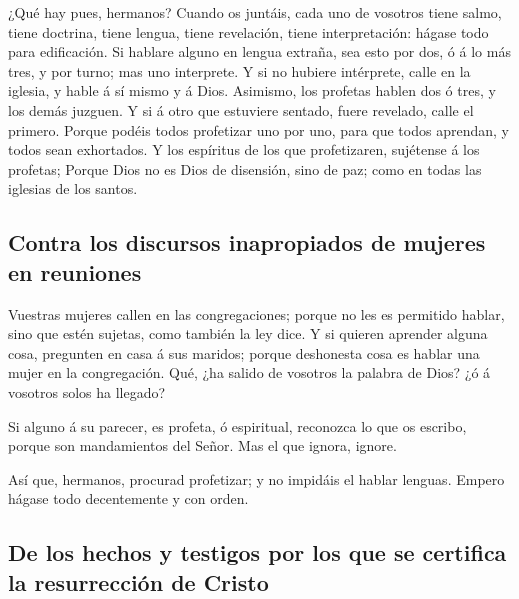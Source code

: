  ¿Qué hay pues, hermanos? Cuando os juntáis, cada uno de
vosotros tiene salmo, tiene doctrina, tiene lengua, tiene revelación,
tiene interpretación: hágase todo para edificación.  Si
hablare alguno en lengua extraña, sea esto por dos, ó á lo más tres, y
por turno; mas uno interprete.  Y si no hubiere intérprete,
calle en la iglesia, y hable á sí mismo y á Dios. 
Asimismo, los profetas hablen dos ó tres, y los demás juzguen.
 Y si á otro que estuviere sentado, fuere revelado, calle
el primero.  Porque podéis todos profetizar uno por uno,
para que todos aprendan, y todos sean exhortados.  Y los
espíritus de los que profetizaren, sujétense á los profetas;
 Porque Dios no es Dios de disensión, sino de paz; como en
todas las iglesias de los santos.

\hypertarget{contra-los-discursos-inapropiados-de-mujeres-en-reuniones}{%
\subsection{Contra los discursos inapropiados de mujeres en
reuniones}\label{contra-los-discursos-inapropiados-de-mujeres-en-reuniones}}

 Vuestras mujeres callen en las congregaciones; porque no
les es permitido hablar, sino que estén sujetas, como también la ley
dice.  Y si quieren aprender alguna cosa, pregunten en casa
á sus maridos; porque deshonesta cosa es hablar una mujer en la
congregación.  Qué, ¿ha salido de vosotros la palabra de
Dios? ¿ó á vosotros solos ha llegado?

 Si alguno á su parecer, es profeta, ó espiritual,
reconozca lo que os escribo, porque son mandamientos del Señor.
 Mas el que ignora, ignore.

 Así que, hermanos, procurad profetizar; y no impidáis el
hablar lenguas.  Empero hágase todo decentemente y con
orden.

\hypertarget{de-los-hechos-y-testigos-por-los-que-se-certifica-la-resurrecciuxf3n-de-cristo}{%
\subsection{De los hechos y testigos por los que se certifica la
resurrección de
Cristo}\label{de-los-hechos-y-testigos-por-los-que-se-certifica-la-resurrecciuxf3n-de-cristo}}

